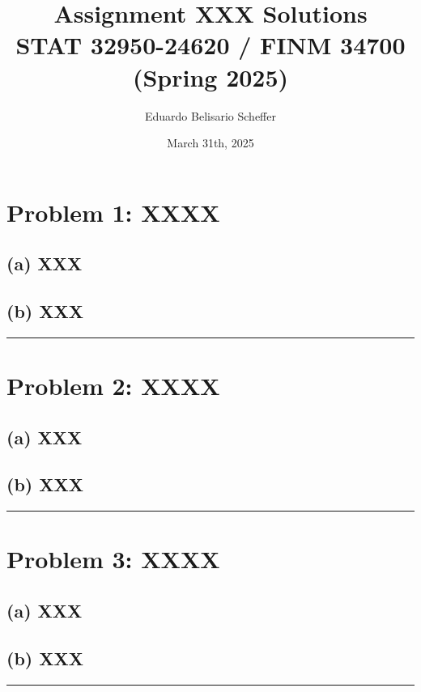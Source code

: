 \documentclass[11pt]{article}
\title{\textbf{Assignment XXX Solutions} \\ 
STAT 32950-24620 / FINM 34700 (Spring 2025)}
\author{Eduardo Belisario Scheffer}
\date{\vspace{0.5em} March 31th, 2025}
\begin{document}
\maketitle

\section*{Problem 1: XXXX}

\subsection*{(a) XXX}


\subsection*{(b) XXX}


\bigskip
\hrule
\bigskip

\newpage

\section*{Problem 2: XXXX}

\subsection*{(a) XXX}


\subsection*{(b) XXX}



\bigskip
\hrule
\bigskip

\newpage

\section*{Problem 3: XXXX}

\subsection*{(a) XXX}


\subsection*{(b) XXX}



\bigskip
\hrule
\bigskip
\end{document}
